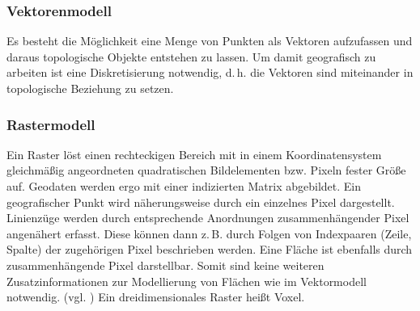\subsubsection{Vektorenmodell}

Es besteht die Möglichkeit eine Menge von Punkten als Vektoren aufzufassen und daraus topologische Objekte entstehen zu lassen.
Um damit geografisch zu arbeiten ist eine Diskretisierung notwendig, d.\,h. die Vektoren sind miteinander in topologische Beziehung zu setzen.

\subsubsection{Rastermodell}
Ein Raster löst einen rechteckigen Bereich mit in einem Koordinatensystem gleichmäßig angeordneten quadratischen Bildelementen bzw. Pixeln fester Größe auf.
Geodaten werden ergo mit einer indizierten Matrix abgebildet.
Ein geografischer Punkt wird näherungsweise durch ein einzelnes Pixel dargestellt.
Linienzüge werden durch entsprechende Anordnungen zusammenhängender Pixel angenähert erfasst.
Diese können dann z.\,B. durch Folgen von Indexpaaren (Zeile, Spalte) der zugehörigen Pixel beschrieben werden.
Eine Fläche ist ebenfalls durch zusammenhängende Pixel darstellbar.
Somit sind keine weiteren Zusatzinformationen zur Modellierung von Flächen wie im Vektormodell notwendig. (vgl. \cite[S.136]{book:gi-theopluspraxis3})
Ein dreidimensionales Raster heißt Voxel.

